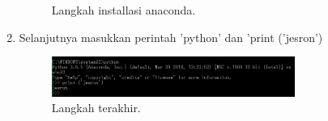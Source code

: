 \begin{enumerate}
\begin{figure}[ht]
\caption{Langkah installasi anaconda.}
\end{figure}
\item  Selanjutnya masukkan perintah 'python' dan 'print ('jesron')
\begin{figure}[ht]
\centerline{\includegraphics[width=0.75\textwidth]{figures/4.JPEG}}
\caption{Langkah terakhir.}
\end{figure}
\end{enumerate}